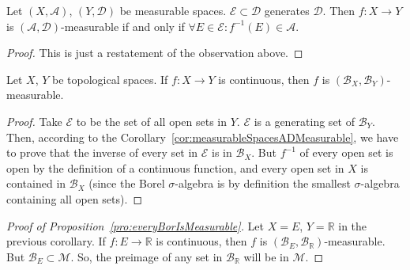 \begin{corollary}
    \label{cor:measurableSpacesADMeasurable}
    Let $(X, \mathcal{A})$, $(Y, \mathcal{D})$ be measurable spaces.
    $\mathcal{E} \subset \mathcal{D}$ generates $\mathcal{D}$. Then
    $f : X \to Y$ is $(\mathcal{A}, \mathcal{D})$-measurable if and only if
    $\forall E \in \mathcal{E}: f^{-1}(E) \in \mathcal{A}$.
\end{corollary}
\begin{proof}
    This is just a restatement of the observation above.
\end{proof}

\begin{corollary}
    Let $X$, $Y$ be topological spaces. If $f: X \to Y$ is continuous,
    then $f$ is $(\mathcal{B}_X, \mathcal{B}_Y)$-measurable.
\end{corollary}
\begin{proof}
    Take $\mathcal{E}$ to be the set of all open sets in $Y$. 
    $\mathcal{E}$ is a generating set of $\mathcal{B}_Y$. Then, according
    to the Corollary~\ref{cor:measurableSpacesADMeasurable}, we have to prove that the inverse of every set in $\mathcal{E}$
    is in $\mathcal{B}_X$. But $f^{-1}$ of every open set is open by the
    definition of a continuous function, and every open set in $X$ 
    is contained in $\mathcal{B}_X$ (since the Borel $\sigma$-algebra
    is by definition the smallest $\sigma$-algebra containing all open sets).
\end{proof}
\begin{proof}[Proof of Proposition~\ref{pro:everyBorIsMeasurable}]
    Let $X = E$, $Y = \mathbb{R}$ in the previous corollary.
    If $f : E \to \mathbb{R}$ is continuous,
    then $f$ is $(\mathcal{B}_E, \mathcal{B}_\mathbb{R})$-measurable.
    But $\mathcal{B}_E \subset \mathcal{M}$. So, the preimage of any 
    set in $\mathcal{B}_\mathbb{R}$ will be in $\mathcal{M}$.
\end{proof}

